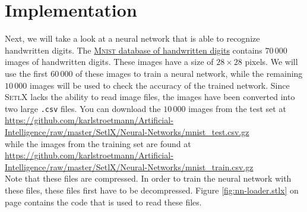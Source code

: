 \section{Implementation}
Next, we will take a look at a neural network that is able to recognize handwritten digits.  The
\href{http://yann.lecun.com/exdb/mnist/}{\textsc{Mnist} database of handwritten digits}
contains $70\,000$ images of handwritten digits.  These images have a size of $28 \times 28$ pixels.
We will use the first $60\,000$ of these images to train a neural network, while the remaining $10\,000$ images
will be used to check the accuracy of the trained network.  Since \textsc{SetlX} lacks the ability to read
image files, the images have been converted into two large \texttt{.csv} files.  You can download the $10\,000$
images from the test set at
\\[0.2cm]
\hspace*{-0.3cm}
\href{https://github.com/karlstroetmann/Artificial-Intelligence/raw/master/SetlX/Neural-Networks/mnist_test.csv.gz}{https://github.com/karlstroetmann/Artificial-Intelligence/raw/master/SetlX/Neural-Networks/mnist\_test.csv.gz}
\\[0.2cm]
while the images from the training set are found at
\\[0.2cm]
\hspace*{-0.3cm}
\href{https://github.com/karlstroetmann/Artificial-Intelligence/raw/master/SetlX/Neural-Networks/mnist_train.csv.gz}{https://github.com/karlstroetmann/Artificial-Intelligence/raw/master/SetlX/Neural-Networks/mnist\_train.csv.gz}
\\[0.2cm]
Note that these files are compressed.  In order to train the neural network with these files, these files first
have to be decompressed.  Figure \ref{fig:nn-loader.stlx} on page \pageref{fig:nn-loader.stlx} contains the
code that is used to read these files.

